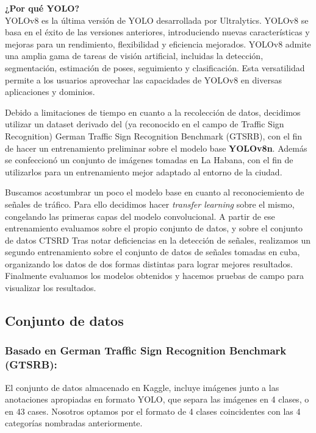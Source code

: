 \documentclass{article}
\begin{document}
\begin{tcolorbox}
\textbf{¿Por qué YOLO?}\\
YOLOv8 es la última versión de YOLO desarrollada por Ultralytics. YOLOv8 se basa en el éxito de las versiones anteriores, introduciendo nuevas características y mejoras para un rendimiento, flexibilidad y eficiencia mejorados. YOLOv8 admite una amplia gama de tareas de visión artificial, incluidas la detección, segmentación, estimación de poses, seguimiento y clasificación. Esta versatilidad permite a los usuarios aprovechar las capacidades de YOLOv8 en diversas aplicaciones y dominios.
\end{tcolorbox}

Debido a limitaciones de tiempo en cuanto a la recolección de datos, decidimos utilizar un dataset derivado del (ya reconocido en el campo de Traffic Sign Recognition) German Traffic Sign Recognition Benchmark (GTSRB), con el fin de hacer un entrenamiento preliminar sobre el modelo base \textbf{YOLOv8n}. Además se confeccionó un conjunto de imágenes tomadas en La Habana, con el fin de utilizarlos para un entrenamiento mejor adaptado al entorno de la ciudad.

Buscamos acostumbrar un poco el modelo base en cuanto al reconociemiento de señales de tráfico. Para ello decidimos hacer \textit{transfer learning} sobre el mismo, congelando las primeras capas del modelo convolucional. A partir de ese entrenamiento evaluamos sobre el propio conjunto de datos, y sobre el conjunto de datos CTSRD Tras notar deficiencias en la detección de señales, realizamos un segundo entrenamiento sobre el conjunto de datos de señales tomadas en cuba, organizando los datos de dos formas distintas para lograr mejores resultados. Finalmente evaluamos los modelos obtenidos y hacemos pruebas de campo para visualizar los resultados. 



\subsection{Conjunto de datos}
\subsubsection{Basado en German Traffic Sign Recognition Benchmark (GTSRB):}
El conjunto de datos almacenado en Kaggle, incluye imágenes junto a las anotaciones apropiadas en formato YOLO, que separa las imágenes en 4 clases, o en 43 cases. Nosotros optamos por el formato de 4 clases coincidentes con las 4 categorías nombradas anteriormente.
\end{document}
